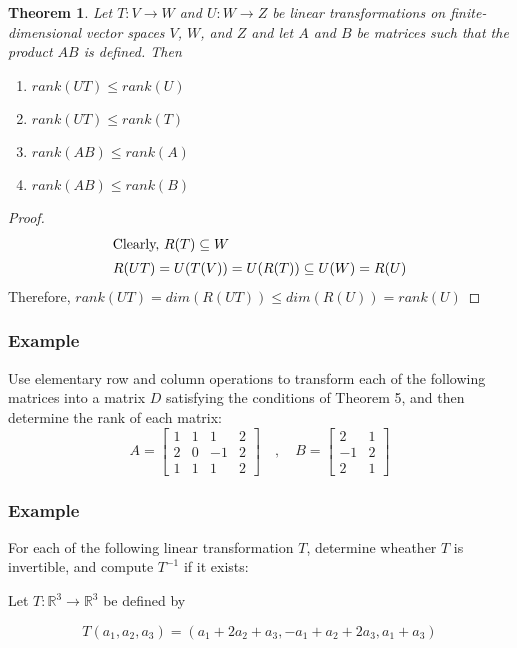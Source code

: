 \documentclass[10pt, oneside]{article}
\newcommand{\R}{\mathbb{R}}
\newtheorem{thm}{Theorem}
\begin{document}
\begin{thm}
	Let $T:V \to W$ and $U:W \to Z$ be linear transformations on finite-dimensional vector spaces $V$, $W$, and $Z$ and let $A$ and $B$ be matrices such that the product $AB$ is defined.
	Then
	\begin{enumerate}
		\item $rank(UT) \leq rank(U)$
		\item $rank(UT) \leq rank(T)$
		\item $rank(AB) \leq rank(A)$
		\item $rank(AB) \leq rank(B)$
	\end{enumerate}
\end{thm}

\begin{proof}
	\begin{align*}
		\intertext{Clearly, $R(T) \subseteq W$}
		R(UT) = U(T(V)) = U(R(T)) \subseteq U(W) = R(U)
	\end{align*}
	Therefore, $rank(UT) = dim(R(UT)) \leq dim(R(U)) = rank(U)$
\end{proof}

\subsubsection{Example}
Use elementary row and column operations to transform each of the following matrices into a matrix $D$ satisfying the conditions of Theorem 5, and then determine the rank of each matrix:
\[
	A = \begin{bmatrix} 1 & 1 & 1 & 2 \\ 2 & 0 & -1 & 2 \\ 1 & 1 & 1 & 2 \end{bmatrix} \quad , \quad B = \begin{bmatrix} 2 & 1 \\ -1 & 2 \\ 2 & 1 \end{bmatrix}
\]



\subsubsection{Example}
For each of the following linear transformation $T$, determine wheather $T$ is invertible, and compute $T^{-1}$ if it exists:

Let $T: \R^3 \to \R^3$ be defined by

\[
	T(a_1, a_2, a_3) = (a_1 + 2a_2 + a_3, -a_1 + a_2 + 2a_3, a_1 + a_3)
\]
\end{document}
